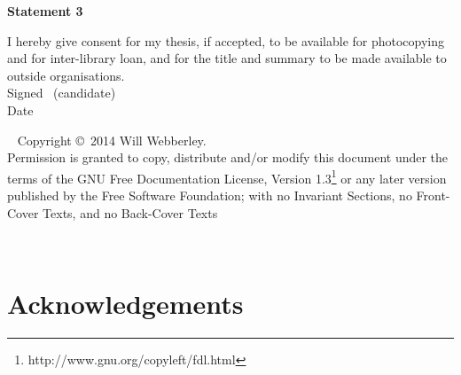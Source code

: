 \vfill

\textbf{\large Statement 3}

I hereby give consent for my thesis, if accepted, to be available for photocopying and for inter-library loan,
 and for the title and summary to be made available to outside organisations.\\[2ex]
Signed \dotfill \ (candidate) \hspace*{10em}\\[1ex]
Date\ \ \ \ \ \dotfill \hspace*{18em}

\vfill

\cleardoublepage


\thispagestyle{plain}
\ \vfill{\small
Copyright \copyright\ 2014 Will Webberley.\\
Permission is granted to copy, distribute and/or modify this document
under the terms of the GNU Free Documentation License, Version 1.3\footnote{http://www.gnu.org/copyleft/fdl.html} or
any later version published by the Free Software Foundation; with no
Invariant Sections, no Front-Cover Texts, and no Back-Cover Texts}\\[3.5ex]
\cleardoublepage


\ \vspace*{1.11cm}
\begin{flushright}
\end{flushright}
\newpage
\markboth{}{}
\cleardoublepage

\chapter*{Acknowledgements}


